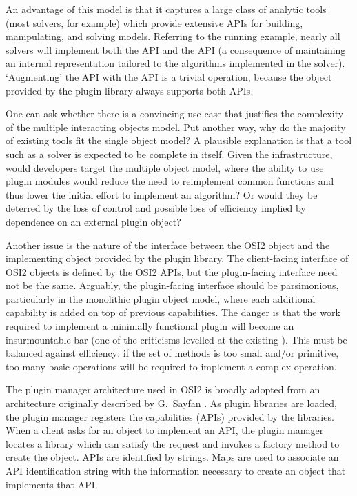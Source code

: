 \documentclass{article}
\newcommand{\OsiTwo}{OSI2\xspace}
\newcommand{\OsiTwoModel}{\pgmid{Osi2::ModelAPI}\xspace}
\newcommand{\OsiTwoSolve}{\pgmid{Osi2::SolveAPI}\xspace}
\begin{document}
\begin{itemize}
  An advantage of this model is that it captures a large class of analytic
  tools (most solvers, for example) which provide extensive APIs for
  building, manipulating, and solving models.
  Referring to the running example, nearly all solvers will implement both the
  \OsiTwoModel API and the \OsiTwoSolve API (a consequence of maintaining an
  internal representation tailored to the algorithms implemented in the solver).
  `Augmenting' the \OsiTwoModel API with the \OsiTwoSolve API is a
  trivial operation, because the object provided by the plugin library always
  supports both APIs.
\end{itemize}

One can ask whether there is a convincing use case that justifies the
complexity of the multiple interacting objects model.
Put another way, why do the majority of existing tools fit the single object
model\@?
A plausible explanation is that a tool such as a solver is expected to be 
complete in itself.
Given the infrastructure, would developers target the multiple object model,
where the ability to use plugin modules would reduce the need to reimplement
common functions and thus lower the initial effort to implement an
algorithm\@?
Or would they be deterred by the loss of control and possible loss of
efficiency implied by dependence on an external plugin object?

Another issue is the nature of the interface between the \OsiTwo object
and the implementing object provided by the plugin library.
The client-facing interface of \OsiTwo objects is defined by the \OsiTwo APIs,
but the plugin-facing interface need not be the same.
Arguably, the plugin-facing interface should be parsimonious, particularly in
the monolithic plugin object model, where each additional capability is
added on top of previous capabilities.
The danger is that the work required to implement a minimally functional
plugin will become an insurmountable bar (one of the criticisms levelled at
the existing ).
This must be balanced against efficiency: if the set of methods is too small
and/or primitive, too many basic operations will be required to implement a
complex operation.



The plugin manager architecture used in \OsiTwo is broadly adopted from an
architecture originally described by G.~Sayfan \cite{say07}.
As plugin libraries are loaded, the plugin manager registers the capabilities
(APIs) provided by the libraries.
When a client asks for an object to implement an API, the plugin manager
locates a library which can satisfy the request and invokes a factory method
to create the object.
APIs are identified by strings.
Maps are used to associate an API identification string with the information
necessary to create an object that implements that API.
\end{document}
